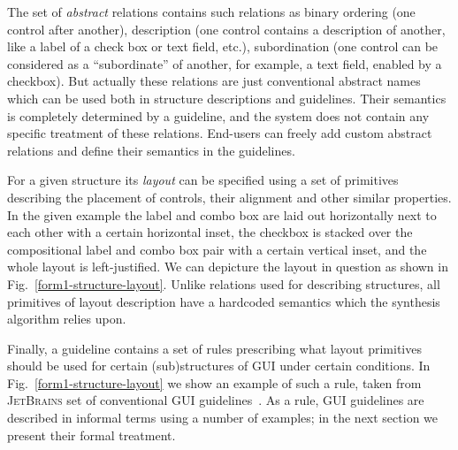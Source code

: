 The set of \emph{abstract} relations contains such relations as binary ordering (one control after another), description (one
control contains a description of another, like a label of a check box or text field, etc.), subordination (one control can
be considered as a ``subordinate'' of another, for example, a text field, enabled by a checkbox). But actually these
relations are just conventional abstract names which can be used both in structure descriptions and guidelines. Their
semantics is completely determined by a guideline, and the system does not contain any specific treatment of
these relations. End-users can freely add custom abstract relations and define their semantics in the guidelines.

For a given structure its \emph{layout} can be specified using a set of primitives describing the placement
of controls, their alignment and other similar properties. In the given example the label and combo box are
laid out horizontally next to each other with a certain horizontal inset, the checkbox is stacked over the compositional
label and combo box pair with a certain vertical inset, and the whole layout is left-justified. We can depicture the
layout in question as shown in Fig.~\ref{form1-structure-layout}. Unlike relations used for
describing structures, all primitives of layout description have a hardcoded semantics which the
synthesis algorithm relies upon.

Finally, a guideline contains a set of rules prescribing what layout primitives should be used for
certain (sub)structures of GUI under certain conditions. In Fig.~\ref{form1-structure-layout}
we show an example of such a rule, taken from \textsc{JetBrains} set of conventional GUI guidelines~\cite{JBG}.
As a rule, GUI guidelines are described in informal terms using a number of examples; in the next section
we present their formal treatment.



